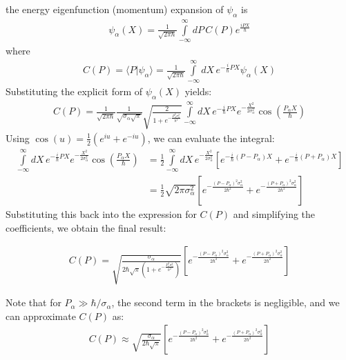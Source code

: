 the energy eigenfunction (momentum) expansion of $\psi_\alpha$ is
\begin{align}
  \psi_\alpha(X)=\frac1{\sqrt{2\pi\hbar}}\int\limits_{-\infty}^{\infty}dP\, C(P)e^{\frac{iPX}{\hbar}}
\end{align}
where
\begin{align}
  C(P) = \langle P|\psi_\alpha\rangle = \frac{1}{\sqrt{2\pi\hbar}}\int\limits_{-\infty}^{\infty}dX\, e^{-\frac{i}{\hbar}PX}\psi_\alpha(X)
\end{align}
Substituting the explicit form of $\psi_\alpha(X)$ yields:
\begin{align}
  C(P) = \frac{1}{\sqrt{2\pi\hbar}}\frac{1}{\sqrt{\sigma_\alpha\sqrt{\pi}}}\sqrt{\frac{2}{1+e^{-\frac{P_\alpha^2\sigma_\alpha^2}{\hbar^2}}}}\int\limits_{-\infty}^{\infty}dX\, e^{-\frac{i}{\hbar}PX}e^{-\frac{X^2}{2\sigma_\alpha^2}}\cos\left(\frac{P_\alpha X}{\hbar}\right)
\end{align}
Using $\cos(u) = \frac{1}{2}(e^{iu} + e^{-iu})$, we can evaluate the integral:
\begin{align}
  \int\limits_{-\infty}^{\infty}dX\, e^{-\frac{i}{\hbar}PX}e^{-\frac{X^2}{2\sigma_\alpha^2}}\cos\left(\frac{P_\alpha X}{\hbar}\right) & = \frac{1}{2}\int\limits_{-\infty}^{\infty}dX\, e^{-\frac{X^2}{2\sigma_\alpha^2}}\left[ e^{-\frac{i}{\hbar}(P-P_\alpha)X} + e^{-\frac{i}{\hbar}(P+P_\alpha)X} \right] \nonumber \\
  & = \frac{1}{2}\sqrt{2\pi\sigma_\alpha^2}\left[ e^{-\frac{(P-P_\alpha)^2\sigma_\alpha^2}{2\hbar^2}} + e^{-\frac{(P+P_\alpha)^2\sigma_\alpha^2}{2\hbar^2}} \right]
\end{align}
Substituting this back into the expression for $C(P)$ and simplifying the coefficients, we obtain the final result:
\begin{importantbox}
  \begin{align}
    C(P) = \sqrt{\frac{\sigma_\alpha}{2\hbar\sqrt{\pi}\left(1+e^{-\frac{P_\alpha^2\sigma_\alpha^2}{\hbar^2}}\right)}}\left[ e^{-\frac{(P-P_\alpha)^2\sigma_\alpha^2}{2\hbar^2}} + e^{-\frac{(P+P_\alpha)^2\sigma_\alpha^2}{2\hbar^2}} \right]\label{eq:proj-CP}
  \end{align}

  Note that for $P_\alpha \gg \hbar/\sigma_\alpha$, the second term in the brackets is negligible, and we can approximate $C(P)$ as:
  \begin{align}
    C(P) \approx \sqrt{\frac{\sigma_\alpha}{2\hbar\sqrt{\pi}}}\left[ e^{-\frac{(P-P_\alpha)^2\sigma_\alpha^2}{2\hbar^2}}+ e^{-\frac{(P+P_\alpha)^2\sigma_\alpha^2}{2\hbar^2}} \right]\label{eq:proj-CP-approx}
  \end{align}
\end{importantbox}
